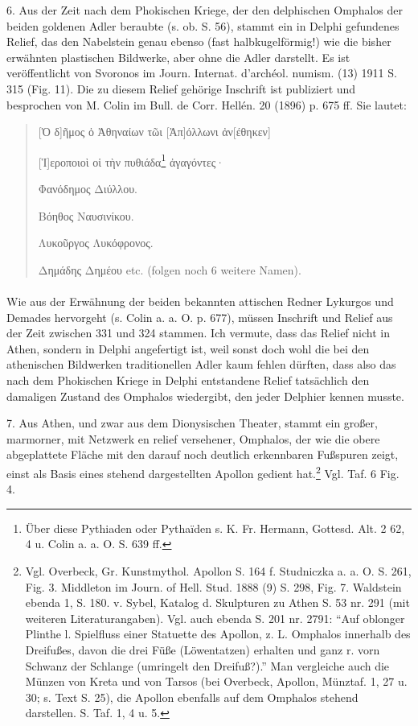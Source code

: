 \documentclass[a4paper, 11pt, oneside]{article}
\begin{document}
6. Aus der Zeit nach dem Phokischen Kriege, der den delphischen Omphalos der beiden goldenen Adler beraubte (s. ob. S. 56), stammt ein in Delphi gefundenes Relief, das den Nabelstein genau ebenso (fast halbkugelförmig!) wie die bisher erwähnten plastischen Bildwerke, aber ohne die Adler darstellt. Es ist veröffentlicht von Svoronos im Journ. Internat. d'archéol. numism. (13) 1911 S. 315 (Fig. 11). Die zu diesem Relief gehörige Inschrift ist publiziert und besprochen von M. Colin im Bull. de Corr. Hellén. 20 (1896) p. 675 ff. Sie lautet:
\begin{quotation}
[Ὁ δ]ῆμος ὁ Ἀθηναίων τῶι [Ἀπ]όλλωνι ἀν[έθηκεν]

[Ἱ]εροποιοὶ οἱ τὴν πυθιάδα\footnote{Über diese Pythiaden oder Pythaïden s. K. Fr. Hermann, Gottesd. Alt. 2 62, 4 u. Colin a. a. O. S. 639 ff.} ἀγαγόντες·

Φανόδημος Διύλλου.

Βόηθος Ναυσινίκου.

Λυκοῦργος Λυκόφρονος.

Δημάδης Δημέου etc. (folgen noch 6 weitere Namen).
\end{quotation}
\paragraph{}
Wie aus der Erwähnung der beiden bekannten attischen Redner Lykurgos und Demades hervorgeht (s. Colin a. a. O. p. 677), müssen Inschrift und Relief aus der Zeit zwischen 331 und 324 stammen. Ich vermute, dass das Relief nicht in Athen, sondern in Delphi angefertigt ist, weil sonst doch wohl die bei den athenischen Bildwerken traditionellen Adler kaum fehlen dürften, dass also das nach dem Phokischen Kriege in Delphi entstandene Relief tatsächlich den damaligen Zustand des Omphalos wiedergibt, den jeder Delphier kennen musste.

7. Aus Athen, und zwar aus dem Dionysischen Theater, stammt ein großer, marmorner, mit Netzwerk en relief versehener, Omphalos, der wie die obere abgeplattete Fläche mit den darauf noch deutlich erkennbaren Fußspuren zeigt, einst als Basis eines stehend dargestellten Apollon gedient hat.\footnote{Vgl. Overbeck, Gr. Kunstmythol. Apollon S. 164 f. Studniczka a. a. O. S. 261, Fig. 3. Middleton im Journ. of Hell. Stud. 1888 (9) S. 298, Fig. 7. Waldstein ebenda 1, S. 180. v. Sybel, Katalog d. Skulpturen zu Athen S. 53 nr. 291 (mit weiteren Literaturangaben). Vgl. auch ebenda S. 201 nr. 2791: "`Auf oblonger Plinthe l. Spielfluss einer Statuette des Apollon, z. L. Omphalos innerhalb des Dreifußes, davon die drei Füße (Löwentatzen) erhalten und ganz r. vorn Schwanz der Schlange (umringelt den Dreifuß?)."' Man vergleiche auch die Münzen von Kreta und von Tarsos (bei Overbeck, Apollon, Münztaf. 1, 27 u. 30; s. Text S. 25), die Apollon ebenfalls auf dem Omphalos stehend darstellen. S. Taf. 1, 4 u. 5.} Vgl. Taf. 6 Fig. 4.
\end{document}
